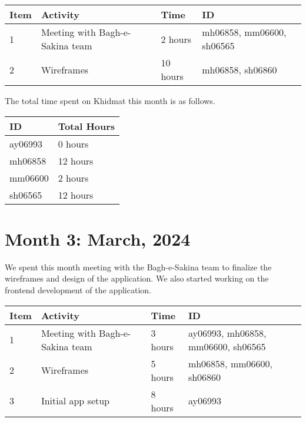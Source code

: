 \documentclass{article}
\begin{document}
\vspace{1em}

\noindent \begin{tabular}{|l|l|l|l|}
  \hline
  Item & Activity & Time   & ID                        \\\hline
  1    & Meeting with Bagh-e-Sakina team & 2 hours   & mh06858, mm06600, sh06565 \\\hline
  2    & Wireframes   & 10 hours & mh06858, sh06860          \\\hline
\end{tabular}

\vspace{1em}

\noindent The total time spent on Khidmat this month is as follows.

\vspace{1em}

\noindent \begin{tabular}{|l|l|}
  \hline
  ID      & Total Hours \\ \hline
  ay06993 & 0 hours     \\ \hline
  mh06858 & 12 hours    \\ \hline
  mm06600 & 2 hours     \\ \hline
  sh06565 & 12 hours    \\ \hline
\end{tabular}

\newpage %
\section*{Month 3: March, 2024}

We spent this month meeting with the Bagh-e-Sakina team to finalize the wireframes and design of the application. We also started working on the frontend development of the application.

\vspace{1em}

\noindent \begin{tabular}{|l|l|l|l|}
  \hline
  Item & Activity & Time & ID \\ \hline
  1 & Meeting with Bagh-e-Sakina team  & 3 hours & ay06993, mh06858, mm06600, sh06565 \\ \hline
  2 & Wireframes & 5 hours & mh06858, mm06600, sh06860 \\ \hline
  3 & Initial app setup & 8 hours & ay06993 \\ \hline
\end{tabular}
\end{document}
